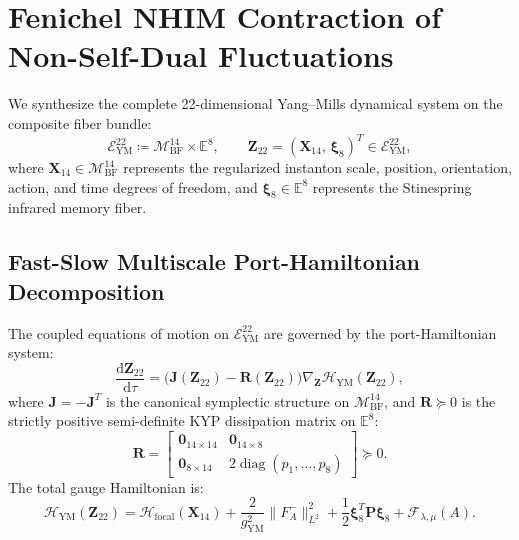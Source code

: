 \documentclass[11pt,a4paper,reqno]{article}
\theoremstyle{plain}
\theoremstyle{definition}
\theoremstyle{remark}
\numberwithin{equation}{section}
\newcommand{\Mbf}{\mathcal{M}_{\mathrm{BF}}^{14}}
\newcommand{\Eym}{\mathcal{E}_{\mathrm{YM}}^{22}}
\providecommand{\diff}{\mathrm{d}}
\DeclareMathOperator{\diag}{diag}
\begin{document}
\section{Fenichel NHIM Contraction of Non-Self-Dual Fluctuations}
\label{sec:fenichel_ym}

We synthesize the complete 22-dimensional Yang--Mills dynamical system on the composite fiber bundle:
\begin{equation}
  \Eym \coloneqq \Mbf \times \mathbb{E}^8, \qquad \bm{Z}_{22} = (\bm{X}_{14}, \, \bm{\xi}_8)^T \in \Eym,
  \label{eq:eym_bundle_def}
\end{equation}
where $\bm{X}_{14} \in \Mbf$ represents the regularized instanton scale, position, orientation, action, and time degrees of freedom, and $\bm{\xi}_8 \in \mathbb{E}^8$ represents the Stinespring infrared memory fiber.

\subsection{Fast-Slow Multiscale Port-Hamiltonian Decomposition}
\label{subsec:ym_port_hamiltonian}

The coupled equations of motion on $\Eym$ are governed by the port-Hamiltonian system:
\begin{equation}
  \frac{\diff \bm{Z}_{22}}{\diff \tau} = \Big( \mathbf{J}(\bm{Z}_{22}) - \mathbf{R}(\bm{Z}_{22}) \Big) \nabla_{\bm{Z}} \mathcal{H}_{\mathrm{YM}}(\bm{Z}_{22}),
  \label{eq:ym_port_hamiltonian}
\end{equation}
where $\mathbf{J} = -\mathbf{J}^T$ is the canonical symplectic structure on $\Mbf$, and $\mathbf{R} \succeq 0$ is the strictly positive semi-definite KYP dissipation matrix on $\mathbb{E}^8$:
\begin{equation}
  \mathbf{R} = \begin{bmatrix} \bm{0}_{14 \times 14} & \bm{0}_{14 \times 8} \\ \bm{0}_{8 \times 14} & 2 \diag(p_1, \dots, p_8) \end{bmatrix} \succeq 0.
\end{equation}
The total gauge Hamiltonian is:
\begin{equation}
  \mathcal{H}_{\mathrm{YM}}(\bm{Z}_{22}) = \mathcal{H}_{\mathrm{focal}}(\bm{X}_{14}) + \frac{2}{g_{\mathrm{YM}}^2} \|F_A^-\|_{L^2}^2 + \frac{1}{2} \bm{\xi}_8^T \mathbf{P} \bm{\xi}_8 + \mathcal{F}_{\lambda,\mu}(A).
  \label{eq:ym_composite_hamiltonian}
\end{equation}
\end{document}
